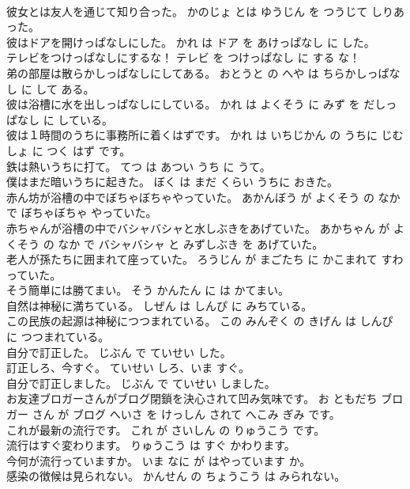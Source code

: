 \documentclass[8pt]{extreport}
\begin{document}
\begin{CJK}{UTF8}{min}
\\	彼女とは友人を通じて知り合った。	かのじょ とは ゆうじん を つうじて しりあった。	
\\	彼はドアを開けっぱなしにした。	かれ は ドア を あけっぱなし に した。	
\\	テレビをつけっぱなしにするな！	テレビ を つけっぱなし に する な！	
\\	弟の部屋は散らかしっぱなしにしてある。	おとうと の へや は ちらかしっぱなし に して ある。	
\\	彼は浴槽に水を出しっぱなしにしている。	かれ は よくそう に みず を だしっぱなし に している。	
\\	彼は１時間のうちに事務所に着くはずです。	かれ は いちじかん の うちに じむしょ に つく はず です。	
\\	鉄は熱いうちに打て。	てつ は あつい うち に うて。	
\\	僕はまだ暗いうちに起きた。	ぼく は まだ くらい うちに おきた。	
\\	赤ん坊が浴槽の中でぼちゃぼちゃやっていた。	あかんぼう が よくそう の なか で ぼちゃぼちゃ やっていた。	
\\	赤ちゃんが浴槽の中でバシャバシャと水しぶきをあげていた。	あかちゃん が よくそう の なか で バシャバシャ と みずしぶき を あげていた。	
\\	老人が孫たちに囲まれて座っていた。	ろうじん が まごたち に かこまれて すわっていた。	
\\	そう簡単には勝てまい。	そう かんたん に は かてまい。	
\\	自然は神秘に満ちている。	しぜん は しんぴ に みちている。	
\\	この民族の起源は神秘につつまれている。	この みんぞく の きげん は しんぴ に つつまれている。	
\\	自分で訂正した。	じぶん で ていせい した。	
\\	訂正しろ、今すぐ。	ていせい しろ、いま すぐ。	
\\	自分で訂正しました。	じぶん で ていせい しました。	
\\	お友達ブロガーさんがブログ閉鎖を決心されて凹み気味です。	お ともだち ブロガー さん が ブログ へいさ を けっしん されて へこみ ぎみ です。	
\\	これが最新の流行です。	これ が さいしん の りゅうこう です。	
\\	流行はすぐ変わります。	りゅうこう は すぐ かわります。	
\\	今何が流行っていますか。	いま なに が はやっています か。	
\\	感染の徴候は見られない。	かんせん の ちょうこう は みられない。	

\end{CJK}
\end{document}
